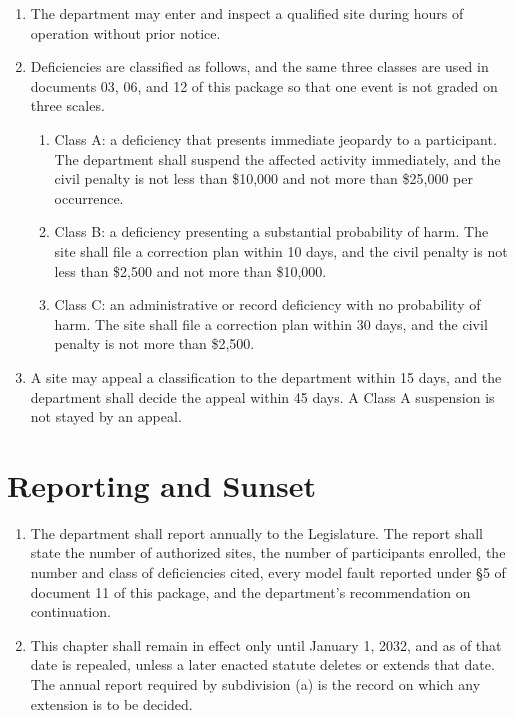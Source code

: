 \begin{enumerate}
\item The department may enter and inspect a qualified site during hours of
  operation without prior notice.

\item Deficiencies are classified as follows, and the same three classes are
  used in documents 03, 06, and 12 of this package so that one event is not
  graded on three scales.
  \begin{enumerate}
  \item Class A: a deficiency that presents immediate jeopardy to a participant.
    The department shall suspend the affected activity immediately, and the
    civil penalty is not less than \$10,000 and not more than \$25,000 per
    occurrence.
  \item Class B: a deficiency presenting a substantial probability of harm. The
    site shall file a correction plan within 10 days, and the civil penalty is
    not less than \$2,500 and not more than \$10,000.
  \item Class C: an administrative or record deficiency with no probability of
    harm. The site shall file a correction plan within 30 days, and the civil
    penalty is not more than \$2,500.
  \end{enumerate}

\item A site may appeal a classification to the department within 15 days, and
  the department shall decide the appeal within 45 days. A Class A suspension is
  not stayed by an appeal.
\end{enumerate}

\section{Reporting and Sunset}

\begin{enumerate}
\item The department shall report annually to the Legislature. The report shall
  state the number of authorized sites, the number of participants enrolled, the
  number and class of deficiencies cited, every model fault reported under §5 of
  document 11 of this package, and the department's recommendation on
  continuation.

\item This chapter shall remain in effect only until January 1, 2032, and as of
  that date is repealed, unless a later enacted statute deletes or extends that
  date. The annual report required by subdivision (a) is the record on which any
  extension is to be decided.
\end{enumerate}
